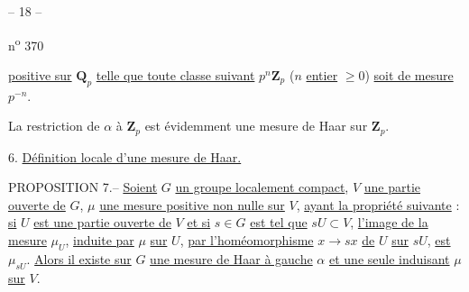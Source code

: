 
\begin{center}-- 18 --\end{center}
\begin{flushright}n\textsuperscript{o} 370\end{flushright}

\uline{positive sur} $\mathbf Q_p$ \uline{telle que toute classe suivant} $p^n\mathbf Z_p$ ($n$ \uline{entier} $\geq0$) \uline{soit de mesure} $p^{-n}$.

La restriction de $\alpha$ à $\mathbf Z_p$ est évidemment une mesure de Haar sur $\mathbf Z_p$.

6. \uline{Définition locale d'une mesure de Haar.}

PROPOSITION 7.-- \uline{Soient} $G$ \uline{un groupe localement compact}, $V$ \uline{une partie ouverte de} $G$, $\mu$ \uline{une mesure positive non nulle sur} $V$, \uline{ayant la propriété suivante} : \uline{si} $U$ \uline{est une partie ouverte de} $V$ \uline{et si} $s\in G$ \uline{est tel que} $sU\subset V$, \uline{l'image de la mesure} $\mu_U$, \uline{induite par} $\mu$ \uline{sur} $U$, \uline{par l'homéomorphisme} $x\to sx$ \uline{de} $U$ \uline{sur} $sU$, \uline{est} $\mu_{sU}$. \uline{Alors il existe sur} $G$ \uline{une mesure de Haar à gauche} $\alpha$ \uline{et une seule induisant} $\mu$ \uline{sur} $V$.

